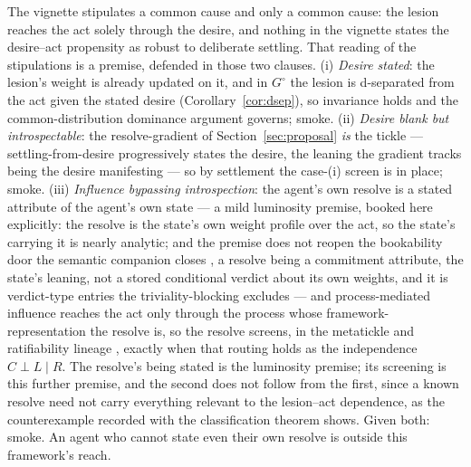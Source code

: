 \begin{corollary}
\label{cor:lesion-sort}
The vignette stipulates a common cause and only a common cause: the lesion reaches the act solely through the desire, and nothing in the vignette states the desire--act propensity as robust to deliberate settling. That reading of the stipulations is a premise, defended in those two clauses. (i) \emph{Desire stated}: the lesion's weight is already updated on it, and in $G^{\circ}$ the lesion is d-separated from the act given the stated desire (Corollary~\ref{cor:dsep}), so invariance holds and the common-distribution dominance argument governs; smoke. (ii) \emph{Desire blank but introspectable}: the resolve-gradient of Section~\ref{sec:proposal} \emph{is} the tickle \cite{eells1982rational} --- settling-from-desire progressively states the desire, the leaning the gradient tracks being the desire manifesting --- so by settlement the case-(i) screen is in place; smoke. (iii) \emph{Influence bypassing introspection}: the agent's own resolve is a stated attribute of the agent's own state --- a mild luminosity premise, booked here explicitly: the resolve is the state's own weight profile over the act, so the state's carrying it is nearly analytic; and the premise does not reopen the bookability door the semantic companion closes \cite{AethusSemantics}, a resolve being a commitment attribute, the state's leaning, not a stored conditional verdict about its own weights, and it is verdict-type entries the triviality-blocking excludes --- and process-mediated influence reaches the act only through the process whose framework-representation the resolve is, so the resolve screens, in the metatickle and ratifiability lineage \cite{eells1982rational, jeffrey1983logic}, exactly when that routing holds as the independence $C \perp L \mid R$. The resolve's being stated is the luminosity premise; its screening is this further premise, and the second does not follow from the first, since a known resolve need not carry everything relevant to the lesion--act dependence, as the counterexample recorded with the classification theorem shows. Given both: smoke. An agent who cannot state even their own resolve is outside this framework's reach.
\end{corollary}

